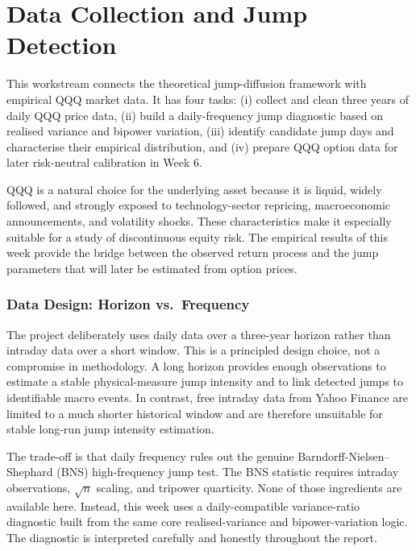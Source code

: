 \documentclass[12pt]{article}
\begin{document}
\newpage
\section*{Data Collection and Jump Detection}

This workstream connects the theoretical jump-diffusion framework with empirical QQQ market data. It has four tasks: (i) collect and clean three years of daily QQQ price data, (ii) build a daily-frequency jump diagnostic based on realised variance and bipower variation, (iii) identify candidate jump days and characterise their empirical distribution, and (iv) prepare QQQ option data for later risk-neutral calibration in Week 6.

QQQ is a natural choice for the underlying asset because it is liquid, widely followed, and strongly exposed to technology-sector repricing, macroeconomic announcements, and volatility shocks. These characteristics make it especially suitable for a study of discontinuous equity risk. The empirical results of this week provide the bridge between the observed return process and the jump parameters that will later be estimated from option prices.

\subsubsection*{Data Design: Horizon vs.\ Frequency}

The project deliberately uses daily data over a three-year horizon rather than intraday data over a short window. This is a principled design choice, not a compromise in methodology. A long horizon provides enough observations to estimate a stable physical-measure jump intensity and to link detected jumps to identifiable macro events. In contrast, free intraday data from Yahoo Finance are limited to a much shorter historical window and are therefore unsuitable for stable long-run jump intensity estimation.

The trade-off is that daily frequency rules out the genuine Barndorff-Nielsen--Shephard (BNS) high-frequency jump test. The BNS statistic requires intraday observations, $\sqrt{n}$ scaling, and tripower quarticity. None of those ingredients are available here. Instead, this week uses a daily-compatible variance-ratio diagnostic built from the same core realised-variance and bipower-variation logic. The diagnostic is interpreted carefully and honestly throughout the report.
\end{document}

